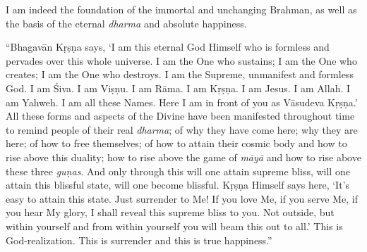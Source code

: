{I am indeed the foundation of the immortal and unchanging Brahman, as well as the basis of the eternal \textit{dharma} and absolute happiness.}


\enquote{Bhagavān Kṛṣṇa says, \enquote{I am this eternal God Himself who is formless and pervades over this whole universe. I am the One who sustains; I am the One who creates; I am the One who destroys. I am the Supreme, unmanifest and formless God. I am Śiva. I am Viṣṇu. I am Rāma. I am Kṛṣṇa. I am Jesus. I am Allah. I am Yahweh. I am all these Names. Here I am in front of you as Vāsudeva Kṛṣṇa.} All these forms and aspects of the Divine have been manifested throughout time to remind people of their real \textit{dharma}; of why they have come here; why they are here; of how to free themselves; of how to attain their cosmic body and how to rise above this duality; how to rise above the game of \textit{māyā} and how to rise above these three \textit{guṇas}. And only through this will one attain supreme bliss, will one attain this blissful state, will one become blissful. Kṛṣṇa Himself says here, \enquote{It’s easy to attain this state. Just surrender to Me! If you love Me, if you serve Me, if you hear My glory, I shall reveal this supreme bliss to you. Not outside, but within yourself and from within yourself you will beam this out to all.} This is God-realization. This is surrender and this is true happiness.}
